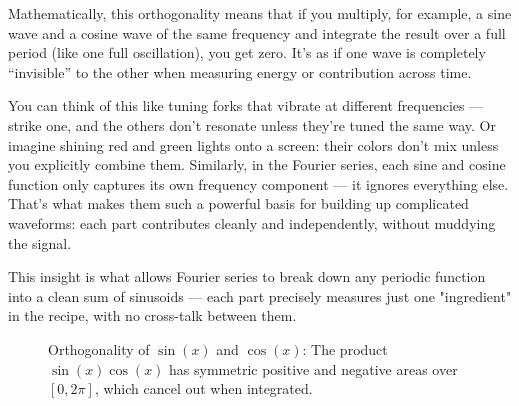Mathematically, this orthogonality means that if you multiply, for example, a sine wave and a cosine wave of the same frequency and integrate the result over a full period (like one full oscillation), you get zero. It’s as if one wave is completely “invisible” to the other when measuring energy or contribution across time.

You can think of this like tuning forks that vibrate at different frequencies — strike one, and the others don’t resonate unless they’re tuned the same way. Or imagine shining red and green lights onto a screen: their colors don’t mix unless you explicitly combine them. Similarly, in the Fourier series, each sine and cosine function only captures its own frequency component — it ignores everything else. That’s what makes them such a powerful basis for building up complicated waveforms: each part contributes cleanly and independently, without muddying the signal.

This insight is what allows Fourier series to break down any periodic function into a clean sum of sinusoids — each part precisely measures just one "ingredient" in the recipe, with no cross-talk between them.

\begin{figure}[H]
    \centering
    \caption{Orthogonality of $\sin(x)$ and $\cos(x)$: The product $\sin(x)\cos(x)$ has symmetric positive and negative areas over $[0, 2\pi]$, which cancel out when integrated.}
    \label{fig:sin_cos_cancellation}
\end{figure}


